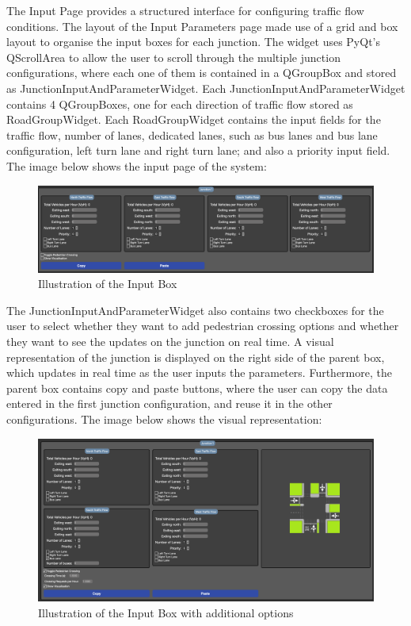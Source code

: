 \documentclass{article}
\begin{document}
    The Input Page provides a structured interface for configuring traffic flow conditions. The layout of the Input Parameters page made use of a grid and box layout to organise the input boxes for each junction. The widget uses PyQt's QScrollArea to allow the user to scroll through the multiple junction configurations, where each one of them
    is contained in a QGroupBox and stored as JunctionInputAndParameterWidget. Each JunctionInputAndParameterWidget contains 4 QGroupBoxes, one for each direction of traffic flow stored as RoadGroupWidget. Each RoadGroupWidget contains the input fields for the
    traffic flow, number of lanes, dedicated lanes, such as bus lanes and bus lane configuration, left turn lane and right turn lane; and also a priority input field. The image below shows the input page of the system:

    \begin{figure}[h!]
        \centering
        \includegraphics[width=\textwidth]{parameter}
        \caption{Illustration of the Input Box}
        \label{fig:parameter}
    \end{figure}

    The JunctionInputAndParameterWidget also contains two checkboxes for the user to select whether they want to add pedestrian crossing options and whether they want to see the updates on the junction on real time. A visual representation of the
    junction is displayed on the right side of the parent box, which updates in real time as the user inputs the parameters. Furthermore, the parent box contains copy and paste buttons, where the user can copy the data entered
    in the first junction configuration, and reuse it in the other configurations. The image below shows the visual representation:

    \begin{figure}[H]
        \centering
        \includegraphics[width=\textwidth]{inputExtra}
        \caption{Illustration of the Input Box with additional options}
        \label{fig:inputExtra}
    \end{figure}
\end{document}
